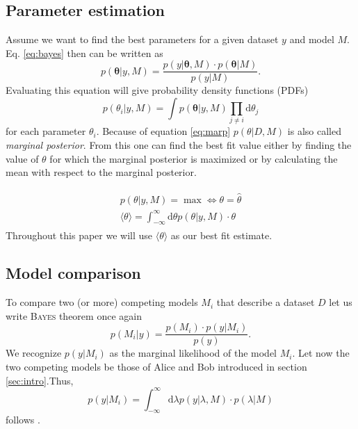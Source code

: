 \documentclass[%
 reprint,
 amsmath,amssymb,
 aps,
]{revtex4-1}
\begin{document}
\subsection{Parameter estimation}
\noindent Assume we want to find the best parameters for a given dataset $y$ and model $M$. Eq. \eqref{eq:bayes} then can be written as
\begin{equation}\label{eq:PDF}
	p(\boldsymbol{\theta} | y,M) = \frac{p(y|\boldsymbol{\theta},M)\cdot p(\boldsymbol{\theta}|M)}{p(y|M)}.
\end{equation}
Evaluating this equation will give probability density functions (PDFs) 
\begin{equation}
\label{eq:marp}
	p(\theta_i|y,M)=\int p(\boldsymbol{\theta}|y,M)\prod_{j\neq i}\text{d}{\theta_j}
\end{equation}
 for each parameter $\theta_i$.  Because of equation \eqref{eq:marp} $p(\theta|D,M)$ is also called \emph{marginal posterior}. From this one can find the best fit value either by finding the value of $\theta$ for which the marginal posterior is maximized or by calculating the mean with respect to the marginal posterior.

\begin{align}
	\begin{split}
		p(\theta|y,M)=\max \Leftrightarrow \theta=\hat{\theta}\\
		\langle\theta\rangle=\int_{-\infty}^{\infty}\text{d}\theta  p(\theta|y,M)\cdot\theta
	\end{split}
\end{align}
Throughout this paper we will use $\langle\theta\rangle$ as our best fit estimate. \cite{sivia}

\subsection{Model comparison}\label{sec:Model_comparison}
\noindent To compare two (or more) competing models $M_i$ that describe a dataset $D$ let us write \textsc{Bayes} theorem once again
\begin{equation}
	p(M_i|y)=\frac{p(M_i)\cdot p(y|M_i)}{p(y)}.
\end{equation}
We recognize $p(y|M_i)$ as the marginal likelihood of the model $M_i$. Let now  the two competing models be those of Alice and Bob introduced in section \eqref{sec:intro}.Thus, $$p(y|M_i)=\int_{-\infty}^{\infty}\text{d}\lambda p(y|\lambda, M)\cdot p(\lambda|M)$$
follows \cite[Chap. 3]{sivia}.
\end{document}
